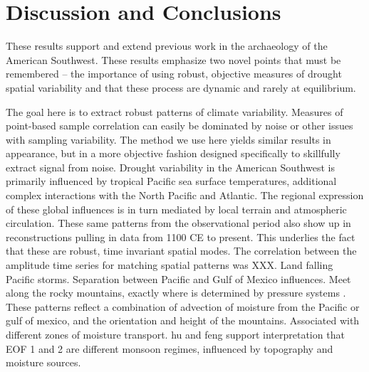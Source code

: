 \documentclass[10pt]{iopart}
\begin{document}




\section*{Discussion and Conclusions}
These results support and extend previous work in the archaeology of the American Southwest.  These results emphasize two novel points that must be remembered -- the importance of using robust, objective measures of drought spatial variability and that these process are dynamic and rarely at equilibrium.


The goal here is to extract robust patterns of climate variability. Measures of point-based sample correlation can easily be dominated by noise or other issues with sampling variability. The method we use here yields similar results in appearance, but in a more objective fashion designed specifically to skillfully extract signal from noise. Drought variability in the American Southwest is primarily influenced by tropical Pacific sea surface temperatures, additional complex interactions with the North Pacific and Atlantic. The regional expression of these global influences is in turn mediated by local terrain and atmospheric circulation. These same patterns from the observational period also show up in reconstructions pulling in data from 1100 CE to present. This underlies the fact that these are robust, time invariant spatial modes. The correlation between the amplitude time series for matching spatial patterns was XXX. 
Land falling Pacific storms. Separation between Pacific and Gulf of Mexico influences. Meet along the rocky mountains, exactly where is determined by pressure systems \parencite{Liu2010}.
These patterns reflect a combination of advection of moisture from the Pacific or gulf of mexico, and the orientation and height of the mountains.
Associated with different zones of moisture transport.
hu and feng support interpretation that EOF 1 and 2 are different monsoon regimes, influenced by topography and moisture sources.
\end{document}
